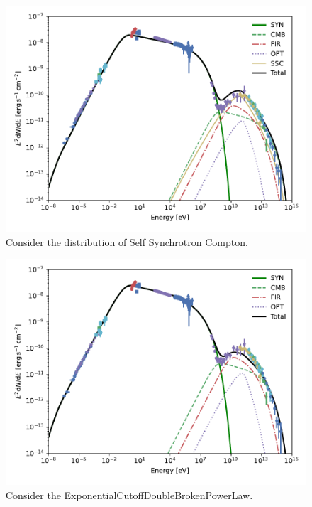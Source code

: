 \documentclass[9pt, mathserif]{beamer}
\begin{document}
        \begin{frame}
            \begin{figure}[t]
                \centering
                \includegraphics[width=0.8\linewidth]{SynIC-BestFitPar2.pdf}
                \caption{Consider the distribution of Self Synchrotron Compton.}
            \end{figure}
        \end{frame}
        \begin{frame}
            \begin{figure}[t]
                \centering
                \includegraphics[width=0.8\linewidth]{SynIC-BestFitPar3.pdf}
                \caption{Consider the ExponentialCutoffDoubleBrokenPowerLaw.}
            \end{figure}
        \end{frame}
\end{document}
